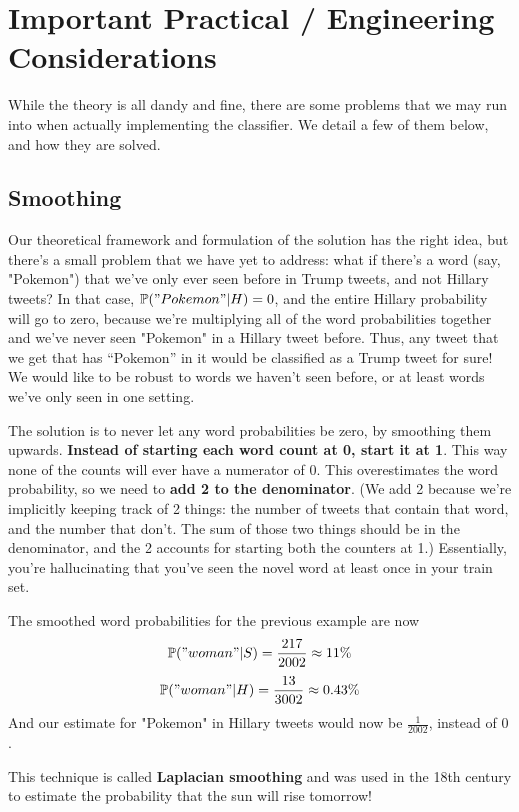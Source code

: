 \documentclass[12pt]{article} \usepackage{amsmath,amssymb,amsthm}
\begin{document}
\section{Important Practical / Engineering Considerations}
While the theory is all dandy and fine, there are some problems that we may run
into when actually implementing the classifier. We detail a few of them below,
and how they are solved.
\subsection{Smoothing}
Our theoretical framework and formulation of the solution has the right idea,
but there's a small problem that we have yet to address: what if there's a word
(say, "Pokemon") that we've only ever seen before in Trump tweets, and not
Hillary tweets? In that case, $\mathbb{P}("Pokemon"|H) = 0$, and the entire
Hillary probability will go to zero, because we're multiplying all of the word
probabilities together and we've never seen "Pokemon" in a Hillary tweet before.
Thus, any tweet that we get that has ``Pokemon'' in it would be classified as a
Trump tweet for sure! We would like to be robust to words we haven't seen
before, or at least words we've only seen in one setting. \newline

The solution is to never let any word probabilities be zero, by smoothing them
upwards. \textbf{Instead of starting each word count at 0, start it at 1}. This
way none of the counts will ever have a numerator of 0. This overestimates the
word probability, so we need to \textbf{add 2 to the denominator}. (We add 2
because we're implicitly keeping track of 2 things: the number of tweets that
contain that word, and the number that don't. The sum of those two things should
be in the denominator, and the 2 accounts for starting both the counters at 1.)
Essentially, you're hallucinating that you've seen the novel word at least once
in your train set. \newline

The smoothed word probabilities for the previous example are now
$$\mathbb{P}("woman"|S) = \frac{217}{2002} \approx 11\%$$
$$\mathbb{P}("woman"|H) = \frac{13}{3002} \approx 0.43\%$$
And our estimate for "Pokemon" in Hillary tweets would now be $\frac{1}{2002}$,
instead of $0$. \newline

This technique is called \textbf{Laplacian smoothing} and was used in the 18th
century to estimate the probability that the sun will rise tomorrow!
\end{document}
